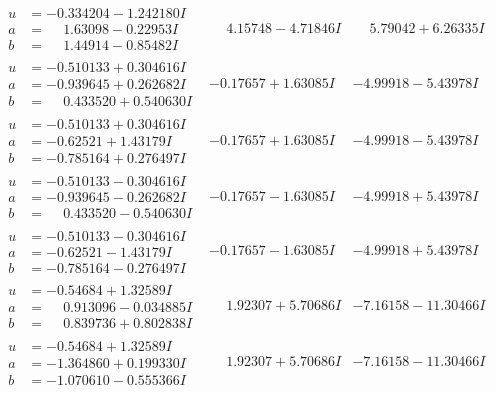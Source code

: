 \documentclass[1p]{elsarticle_modified}
\theoremstyle{definition}
\begin{document}
$$\begin{array}{c|c|c}
\begin{aligned}
u &= -0.334204 - 1.242180 I \\
a &= \phantom{-}1.63098 - 0.22953 I \\
b &= \phantom{-}1.44914 - 0.85482 I\end{aligned}
 & \phantom{-}4.15748 - 4.71846 I & \phantom{-}5.79042 + 6.26335 I \\ \hline\begin{aligned}
u &= -0.510133 + 0.304616 I \\
a &= -0.939645 + 0.262682 I \\
b &= \phantom{-}0.433520 + 0.540630 I\end{aligned}
 & -0.17657 + 1.63085 I & -4.99918 - 5.43978 I \\ \hline\begin{aligned}
u &= -0.510133 + 0.304616 I \\
a &= -0.62521 + 1.43179 I \\
b &= -0.785164 + 0.276497 I\end{aligned}
 & -0.17657 + 1.63085 I & -4.99918 - 5.43978 I \\ \hline\begin{aligned}
u &= -0.510133 - 0.304616 I \\
a &= -0.939645 - 0.262682 I \\
b &= \phantom{-}0.433520 - 0.540630 I\end{aligned}
 & -0.17657 - 1.63085 I & -4.99918 + 5.43978 I \\ \hline\begin{aligned}
u &= -0.510133 - 0.304616 I \\
a &= -0.62521 - 1.43179 I \\
b &= -0.785164 - 0.276497 I\end{aligned}
 & -0.17657 - 1.63085 I & -4.99918 + 5.43978 I \\ \hline\begin{aligned}
u &= -0.54684 + 1.32589 I \\
a &= \phantom{-}0.913096 - 0.034885 I \\
b &= \phantom{-}0.839736 + 0.802838 I\end{aligned}
 & \phantom{-}1.92307 + 5.70686 I & -7.16158 - 11.30466 I \\ \hline\begin{aligned}
u &= -0.54684 + 1.32589 I \\
a &= -1.364860 + 0.199330 I \\
b &= -1.070610 - 0.555366 I\end{aligned}
 & \phantom{-}1.92307 + 5.70686 I & -7.16158 - 11.30466 I \\ \hline\begin{aligned}

\end{aligned}
\end{array}$$
\end{document}
